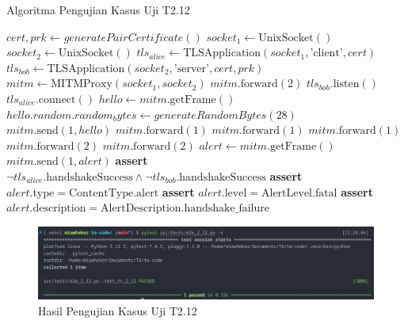 \begin{algorithm}
  \caption{Algoritma Pengujian Kasus Uji T2.12}
  \label{alg:unit.test.t2.12}
  \begin{algorithmic}
    \State $cert, prk \gets generatePairCertificate()$
    \State $socket_1 \gets \text{UnixSocket}()$
    \State $socket_2 \gets \text{UnixSocket}()$
    \State $tls_{alice} \gets \text{TLSApplication}(socket_1, \text{'client'}, cert)$ 
    \State $tls_{bob} \gets \text{TLSApplication}(socket_2, \text{'server'}, cert, prk)$
    \State $mitm \gets \text{MITMProxy}(socket_1, socket_2)$
    \State
    \State $mitm.\text{forward}(2)$ 
    \State $tls_{bob}.\text{listen}()$  
    \State $tls_{alice}.\text{connect}()$  
    \State
    \State $hello \gets mitm.\text{getFrame}()$ 
    \State $hello.random.random_bytes \gets generateRandomBytes(28)$
    \State $mitm.\text{send}(1, hello)$
    \State $mitm.\text{forward}(1)$ 
    \State $mitm.\text{forward}(1)$ 
    \State $mitm.\text{forward}(1)$ 
    \State $mitm.\text{forward}(2)$ 
    \State $mitm.\text{forward}(2)$ 
    \State
    \State $alert \gets mitm.\text{getFrame}()$
    \State $mitm.\text{send}(1, alert)$
    \State
    \State \textbf{assert} $\lnot tls_{alice}.\text{handshakeSuccess} \land \lnot tls_{bob}.\text{handshakeSuccess}$
    \State \textbf{assert} $alert.\text{type} = \text{ContentType.alert}$
    \State \textbf{assert} $alert.\text{level} = \text{AlertLevel.fatal}$
    \State \textbf{assert} $alert.\text{description} = \text{AlertDescription.handshake\_failure}$
  \end{algorithmic}
\end{algorithm}

\begin{figure}[ht]
  \centering
  \includegraphics[width=\textwidth]{chapters/res/appendix-4/2.12.png}
  \caption{Hasil Pengujian Kasus Uji T2.12}
  \label{fig:unit.test.t2.12}
\end{figure}

